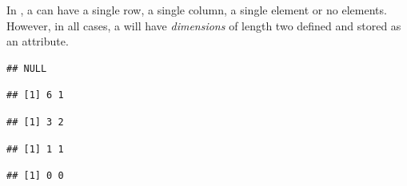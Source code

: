 \documentclass[krantz2]{krantz}\usepackage{knitr}
\begin{document}
\begin{explainbox}
In \Rlang, a  can have a single row, a single column, a single element or no elements. However, in all cases, a  will have \emph{dimensions} of length two defined and stored as an attribute.

\begin{knitrout}\footnotesize
{}\color{fgcolor}\begin{kframe}
\begin{alltt}
 \hlkwb{<-} \hlopt{:}
\end{alltt}
\begin{verbatim}
## NULL
\end{verbatim}
\end{kframe}
\end{knitrout}

\begin{knitrout}\footnotesize
{}\color{fgcolor}\begin{kframe}
\begin{alltt}
 \hlkwb{<-} \hlstd{(}\hlopt{:}\hlstd{,}  \hlstd{=} \hlstd{)}
\end{alltt}
\begin{verbatim}
## [1] 6 1
\end{verbatim}
\begin{alltt}
 \hlkwb{<-} \hlstd{(}\hlopt{:}\hlstd{,}  \hlstd{=} \hlstd{)}
\end{alltt}
\begin{verbatim}
## [1] 3 2
\end{verbatim}
\begin{alltt}
 \hlkwb{<-} \hlstd{(}\hlstd{,}  \hlstd{=} \hlstd{)}
\end{alltt}
\begin{verbatim}
## [1] 1 1
\end{verbatim}
\begin{alltt}
 \hlkwb{<-} \hlstd{(}\hlstd{(),}  \hlstd{=} \hlstd{)}
\end{alltt}
\begin{verbatim}
## [1] 0 0
\end{verbatim}
\end{kframe}
\end{knitrout}

\end{explainbox}
\end{document}

